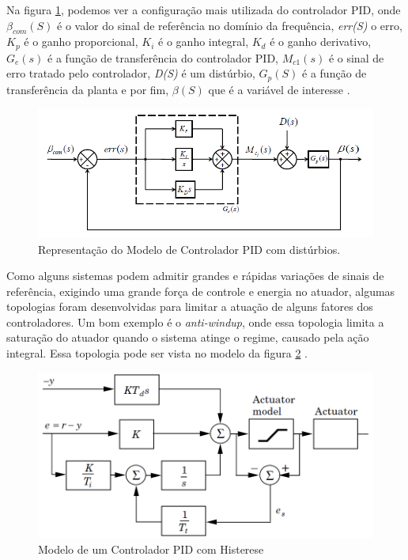 Na figura \ref{fig:pid_controller_Snider_p35}, podemos ver a configuração mais utilizada do controlador PID, onde $\beta_{com}(S)$ é o valor do sinal de referência no domínio da frequência, \textit{err(S)} o erro, \textit{$K_p$} é o ganho proporcional, \textit{$K_i$} é o ganho integral, \textit{$K_d$} é o ganho derivativo, \textit{$G_e(s)$} é a função de transferência do controlador PID, \textit{$M_{c1}(s)$} é o sinal de erro tratado pelo controlador, \textit{D(S)} é um distúrbio, \textit{$G_p(S)$} é a função de transferência da planta e por fim, \textit{$\beta(S)$} que é a variável de interesse \cite{Snider}.

\begin{figure}[!ht]
  \caption{Representação do Modelo de Controlador PID com distúrbios.}
  \begin{center}
      \includegraphics[scale=0.75]{img/pid_controller_Snider_p35}
  \end{center}
  \label{fig:pid_controller_Snider_p35}
\end{figure}

Como alguns sistemas podem admitir grandes e rápidas variações de sinais de referência, exigindo uma grande força de controle e energia no atuador, algumas topologias foram desenvolvidas para limitar a atuação de alguns fatores dos controladores. Um bom exemplo é o \textit{anti-windup}, onde essa topologia limita a saturação do atuador quando o sistema atinge o regime, causado pela ação integral. Essa topologia pode ser vista no modelo da figura \ref{fig:pid_antiwindup_astrom_p83} \cite{Astrom1995}.

\begin{figure}[!ht]
  \caption{Modelo de um Controlador PID com Histerese}
  \begin{center}
      \includegraphics[scale=0.65]{img/pid_antiwindup_astrom_p83}
  \end{center}
  \label{fig:pid_antiwindup_astrom_p83}
\end{figure}

